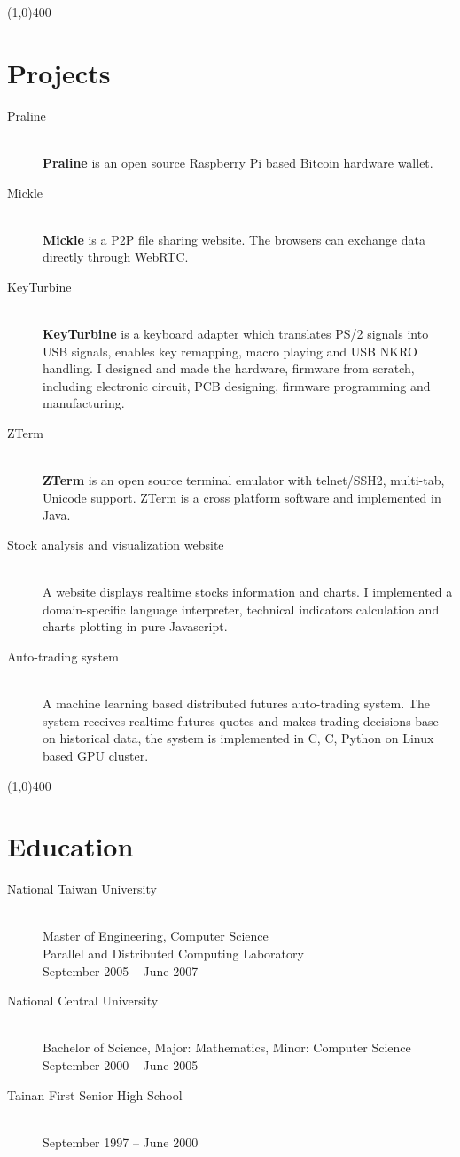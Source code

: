 \documentclass[10pt,a4paper]{article}
\newcommand{\hr}{\noindent\line(1,0){400}}
\newcommand{\br}{\hfill\\}
\newcommand{\CS}{C\nolinebreak\hspace{-.05em}\raisebox{.6ex}{\scriptsize\textbf\#}}
\begin{document}
\hr
\section*{Projects}
\begin{description}
\item[Praline]\br
\textbf{Praline} is an open source Raspberry Pi based Bitcoin hardware wallet.

\item[Mickle]\br
\textbf{Mickle} is a P2P file sharing website. The browsers can exchange data directly through WebRTC.

\item[KeyTurbine]\br
\textbf{KeyTurbine} is a keyboard adapter which translates PS/2 signals into USB signals, enables key remapping, macro playing and USB NKRO handling.
I designed and made the hardware, firmware from scratch, including electronic circuit, PCB designing, firmware programming and manufacturing.

\item[ZTerm]\br
\textbf{ZTerm} is an open source terminal emulator with telnet/SSH2, multi-tab, Unicode support.
ZTerm is a cross platform software and implemented in Java.\br

\item[Stock analysis and visualization website]\br
A website displays realtime stocks information and charts.
I implemented a domain-specific language interpreter, technical indicators calculation and charts plotting in pure Javascript.\br

\item[Auto-trading system]\br
A machine learning based distributed futures auto-trading system.
The system receives realtime futures quotes and makes trading decisions base on historical data, the system is implemented in C, \CS, Python on Linux based GPU cluster.
\end{description}

\hr
\section*{Education}
\begin{description}
\item[National Taiwan University]\br
Master of Engineering, Computer Science\br
Parallel and Distributed Computing Laboratory\br
September 2005 -- June 2007

\item[National Central University]\br
Bachelor of Science, Major: Mathematics, Minor: Computer Science\br
September 2000 -- June 2005

\item[Tainan First Senior High School]\br
September 1997 -- June 2000
\end{description}
\end{document}
